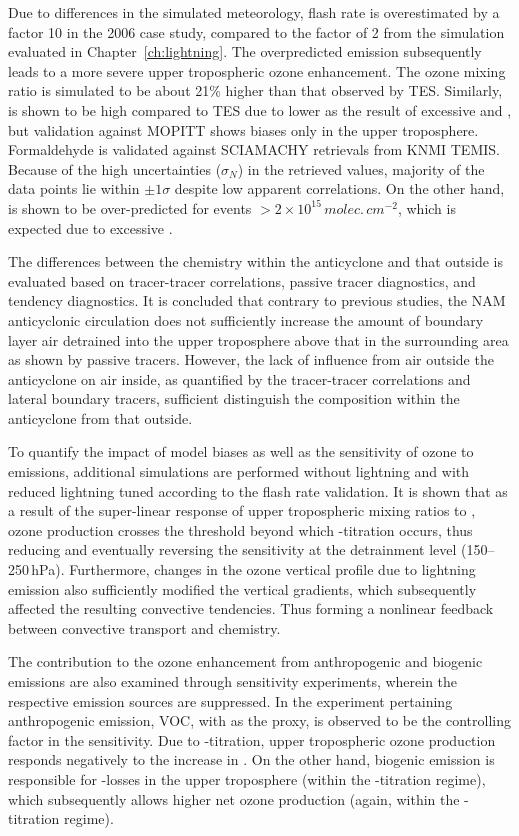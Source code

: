 Due to differences in the simulated meteorology, flash rate is overestimated by a factor 10 in the
2006 case study, compared to the factor of 2 from the simulation evaluated in  Chapter~\ref{ch:lightning}.
The overpredicted {\lnox} emission subsequently leads to a more severe upper tropospheric
ozone enhancement. The ozone mixing ratio is simulated to be about 21\% higher than that
observed by TES. Similarly,  is shown to be high compared to TES due to lower
 as the result of excessive  and , but validation
against MOPITT shows biases only in the upper troposphere. Formaldehyde is validated against SCIAMACHY retrievals
from KNMI TEMIS. Because of the high uncertainties ($\sigma_N$) in the retrieved values,
majority of the data points lie within $\pm1\sigma$ despite low apparent correlations. On the
other hand,  is shown to be over-predicted for events $>2\times10^{15}\,\unit{molec.\,cm^{-2}}$,
which is expected due to excessive {\lnox}.

The differences between the chemistry within the anticyclone and that outside is evaluated
based on tracer-tracer correlations, passive tracer diagnostics, and tendency diagnostics. It
is concluded that contrary to previous studies, the NAM anticyclonic circulation does not
sufficiently increase the amount of boundary layer air detrained into the upper troposphere above
that in the surrounding area as shown by passive tracers. However, the lack of influence from air outside the anticyclone on air inside, as quantified
by the tracer-tracer correlations and lateral boundary tracers, sufficient distinguish the
composition within the anticyclone from that outside.

To quantify the impact of model biases as well as the sensitivity of ozone to {\lnox} emissions,
additional simulations are performed without lightning and with reduced lightning tuned according
to the flash rate validation. It is shown that as a result of the super-linear response of upper
tropospheric  mixing ratios to {\lnox}, ozone production crosses the threshold
beyond which -titration occurs, thus reducing and eventually reversing the
sensitivity at the detrainment level (150--250\,\unit{hPa}). Furthermore, changes in the ozone
vertical profile due to lightning emission also sufficiently modified the vertical gradients, which
subsequently affected the resulting convective tendencies. Thus forming a nonlinear feedback
between convective transport and chemistry.

The contribution to the ozone enhancement from anthropogenic and biogenic emissions are also examined
through sensitivity experiments, wherein the respective emission sources are suppressed. In the
experiment pertaining anthropogenic emission, VOC, with  as the proxy, is observed
to be the controlling factor in the sensitivity. Due to -titration, upper tropospheric
ozone production responds negatively to the increase in . On the other hand, biogenic
emission is responsible for -losses in the upper troposphere (within the
-titration regime), which subsequently allows higher net ozone production (again,
within the -titration regime).

